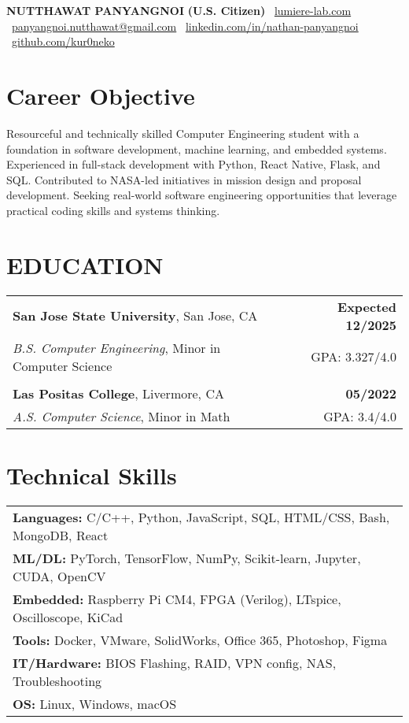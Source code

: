 \documentclass[letterpaper,11pt]{article}
\begin{document}
\begin{center}
  {\small \textbf{NUTTHAWAT PANYANGNOI}} \hspace{1mm} {\small \textbf{(U.S. Citizen)}} \faGlobe\ \href{https://www.lumiere-lab.com}{lumiere-lab.com} \\[4pt]
  \faEnvelope\ \href{mailto:panyangnoi.nutthawat@gmail.com}{panyangnoi.nutthawat@gmail.com} \quad
  \faLinkedin\ \href{https://www.linkedin.com/in/nathan-panyangnoi/}{linkedin.com/in/nathan-panyangnoi} \quad
  \faGithub\ \href{https://github.com/kur0neko}{github.com/kur0neko} \\
\end{center}
\vspace*{-12pt}

\section*{\small Career Objective}
Resourceful and technically skilled Computer Engineering student with a foundation in software development, machine learning, and embedded systems. Experienced in full-stack development with Python, React Native, Flask, and SQL. Contributed to NASA-led initiatives in mission design and proposal development. Seeking real-world software engineering opportunities that leverage practical coding skills and systems thinking.

\section{EDUCATION}
\begin{tabular*}{\textwidth}{l@{\extracolsep{\fill}}r}
\textbf{San Jose State University}, San Jose, CA & \textbf{Expected 12/2025} \\
\textit{B.S. Computer Engineering}, Minor in Computer Science & GPA: 3.327/4.0 \\ 
\\
\textbf{Las Positas College}, Livermore, CA & \textbf{05/2022} \\
\textit{A.S. Computer Science}, Minor in Math & GPA: 3.4/4.0 \\
\end{tabular*}

\section*{Technical Skills}
\begin{tabularx}{\textwidth}{X}
\textbf{Languages:} C/C++, Python, JavaScript, SQL, HTML/CSS, Bash, MongoDB, React\\
\textbf{ML/DL:} PyTorch, TensorFlow, NumPy, Scikit-learn, Jupyter, CUDA, OpenCV\\
\textbf{Embedded:} Raspberry Pi CM4, FPGA (Verilog), LTspice, Oscilloscope, KiCad\\
\textbf{Tools:} Docker, VMware, SolidWorks, Office 365, Photoshop, Figma \\
\textbf{IT/Hardware:} BIOS Flashing, RAID, VPN config, NAS, Troubleshooting \\
\textbf{OS:} Linux, Windows, macOS \\
\end{tabularx}
\end{document}
